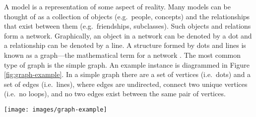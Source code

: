 \documentclass{svmult}
\begin{document}
A model is a representation of some aspect of reality. Many models can be thought of as a collection of objects (e.g.~people, concepts) and the relationships that exist between them (e.g.~friendships, subclasses). Such objects and relations form a network. Graphically, an object in a network can be denoted by a dot and a relationship can be denoted by a line. A structure formed by dots and lines is known as a graph---the mathematical term for a network \cite{intrograph:trudeau1976}. The most common type of graph is the simple graph. An example instance is diagrammed in Figure \ref{fig:graph-example}. In a simple graph there are a set of vertices (i.e.~dots) and a set of edges (i.e.~lines), where edges are undirected, connect two unique vertices (i.e.~no loops), and no two edges exist between the same pair of vertices.
\begin{figure*}[h!]
	\centering
		\texttt{[image: images/graph-example]}
	\caption{\label{fig:graph-example}The prototypical graph is the simple graph. In this structure there exists dots (i.e.~vertices) and lines (i.e.~edges). While the primitives are simple, their amalgamation can yield great complexity.}
\end{figure*}
\end{document}
